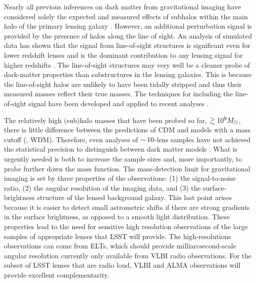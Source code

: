 \documentclass[modern,linenumbers]{aastex62}
\begin{document}
Nearly all previous inferences on dark matter from gravitational imaging have considered solely the expected and measured effects of subhalos within the main halo of the primary lensing galaxy \citep[e.g.,][]{Vegetti:2009aa, Vegetti_2012, Vegetti2014, Hezaveh_2016ltk}.
However, an additional perturbation signal is provided by the presence of halos along the line of sight.
An analysis of simulated data has shown that the signal from line-of-sight structures is significant even for lower redshift lenses and is the dominant contribution to any lensing signal for higher redshifts \citep{Keeton:2002ug,Despali++18}.
The line-of-sight structures may very well be a cleaner probe of dark-matter properties than substructures in the lensing galaxies.
This is because the line-of-sight halos are unlikely to have been tidally stripped and thus their measured masses reflect their true masses.
The techniques for including the line-of-sight signal have been developed and applied to recent analyses \citep{Ritondale++18}. 
 
The relatively high (sub)halo masses that have been probed so far, $\gtrsim 10^9M_\odot$, there is little difference between the predictions of CDM and models with a mass cutoff (\eg, WDM).
Therefore, even analyses of $ {\sim}\,10$-lens samples have not achieved the statistical precision to distinguish between dark matter models \citep{Vegetti2014, Ritondale++18}.
What is urgently needed is both to increase the sample sizes and, more importantly, to probe further down the mass function.
The mass-detection limit for gravitational imaging is set by three properties of the observations: (1) the signal-to-noise ratio, (2) the angular resolution of the imaging data, and (3) the surface-brightness structure of the lensed background galaxy.  This last point arises because it is easier to detect small astrometric shifts if there are strong gradients in the surface brightness, as opposed to a smooth light distribution.
These properties lead to the need for sensitive high resolution observations of the large samples of appropriate lenses that LSST will provide.
The high-resolutions observations can come from ELTs, which should provide milliarcsecond-scale angular resolution currently only available from VLBI radio observations.
For the subset of LSST lenses that are radio loud, VLBI and ALMA observations will provide excellent complementarity.

\vspace{1em} 
\end{document}
